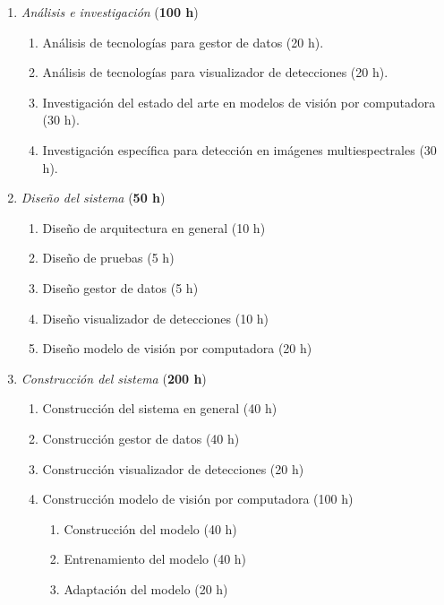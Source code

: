 \documentclass[
11pt, %
]{charter}
\begin{document}
\begin{enumerate}
  \item \textit{Análisis e investigación} (\textbf{100 h})
        \begin{enumerate}
          \item Análisis de tecnologías para gestor de datos (20 h).
          \item Análisis de tecnologías para visualizador de detecciones (20 h).
          \item Investigación del estado del arte en modelos de visión por computadora (30 h).
          \item Investigación específica para detección en imágenes multiespectrales (30 h).
        \end{enumerate}

  \item \textit{Diseño del sistema} (\textbf{50 h})
        \begin{enumerate}
          \item Diseño de arquitectura en general (10 h)
          \item Diseño de pruebas (5 h)
          \item Diseño gestor de datos (5 h)
          \item Diseño visualizador de detecciones (10 h)
          \item Diseño modelo de visión por computadora (20 h)
        \end{enumerate}

  \item \textit{Construcción del sistema} (\textbf{200 h})
        \begin{enumerate}
          \item Construcción del sistema en general (40 h)
          \item Construcción gestor de datos (40 h)
          \item Construcción visualizador de detecciones (20 h)
          \item Construcción modelo de visión por computadora (100 h)
                \begin{enumerate}
                  \item Construcción del modelo (40 h)
                  \item Entrenamiento del modelo (40 h)
                  \item Adaptación del modelo (20 h)
                \end{enumerate}
        \end{enumerate}


\end{enumerate}
\end{document}
